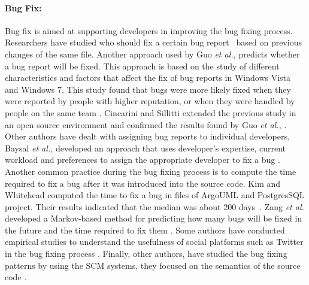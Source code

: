 \documentclass[a4paper, 12pt]{book}
\begin{document}
\paragraph{Bug Fix:} Bug fix is aimed at supporting developers in improving the bug fixing process.
Researchers have studied who should fix a certain bug report~\cite{kagdi2008can,anvik2006should} based on previous changes of the same file. Another approach used by Guo \emph{et al.,} predicts whether a bug report will be fixed. This approach is based on the study of different characteristics and factors that affect the fix of bug reports in Windows Vista and Windows 7. This study found that bugs were more likely fixed when they were reported by people with higher reputation, or when they were handled by people on the same team \cite{guo2010characterizing}. Cincarini and Sillitti extended the previous study in an open source environment and confirmed the results found by Guo \emph{et al.,} \cite{ciancarini2016model}. Other authors have dealt with assigning bug reports to individual developers, Baysal \emph{et al.,} developed an approach that uses developer's expertise, current workload and preferences to assign the appropriate developer to fix a bug \cite{baysal2009bug}. Another common practice during the bug fixing process is to compute the time required to fix a bug after it was introduced into the source code. Kim and Whitehead computed the time to fix a bug in files of ArgoUML and PostgresSQL project. Their results indicated that the median was about 200 days~\cite{kim2006long}. Zang \emph{et al.} developed a Markov-based method for predicting how many bugs will be fixed in the future and the time required to fix them \cite{zhang2013predicting}. Some authors have conducted empirical studies to understand the usefulness of social platforms such as Twitter in the bug fixing process \cite{el2017tweets}. Finally, other authors, have studied the bug fixing patterns by using the SCM systems, they focused on the semantics of the source code \cite{pan2009toward}.
\end{document}
